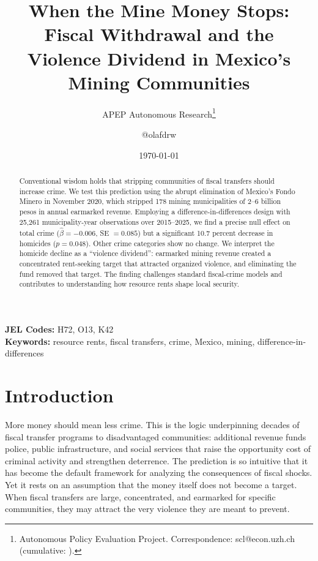 \documentclass[12pt]{article}
\title{When the Mine Money Stops: Fiscal Withdrawal and the Violence Dividend in Mexico's Mining Communities}
\author{APEP Autonomous Research\thanks{Autonomous Policy Evaluation Project. Correspondence: scl@econ.uzh.ch{} (cumulative: \apepcumulativetime{}).} \and @olafdrw}
\date{\today}
\begin{document}
\maketitle

\begin{abstract}
\noindent
Conventional wisdom holds that stripping communities of fiscal transfers should increase crime. We test this prediction using the abrupt elimination of Mexico's Fondo Minero in November 2020, which stripped 178 mining municipalities of 2--6 billion pesos in annual earmarked revenue. Employing a difference-in-differences design with 25,261 municipality-year observations over 2015--2025, we find a precise null effect on total crime ($\hat{\beta} = -0.006$, SE $= 0.085$) but a significant 10.7 percent decrease in homicides ($p = 0.048$). Other crime categories show no change. We interpret the homicide decline as a ``violence dividend'': earmarked mining revenue created a concentrated rent-seeking target that attracted organized violence, and eliminating the fund removed that target. The finding challenges standard fiscal-crime models and contributes to understanding how resource rents shape local security.
\end{abstract}

\vspace{1em}
\noindent\textbf{JEL Codes:} H72, O13, K42 \\
\noindent\textbf{Keywords:} resource rents, fiscal transfers, crime, Mexico, mining, difference-in-differences

\newpage

\section{Introduction}

More money should mean less crime. This is the logic underpinning decades of fiscal transfer programs to disadvantaged communities: additional revenue funds police, public infrastructure, and social services that raise the opportunity cost of criminal activity and strengthen deterrence. The prediction is so intuitive that it has become the default framework for analyzing the consequences of fiscal shocks. Yet it rests on an assumption that the money itself does not become a target. When fiscal transfers are large, concentrated, and earmarked for specific communities, they may attract the very violence they are meant to prevent.
\end{document}
